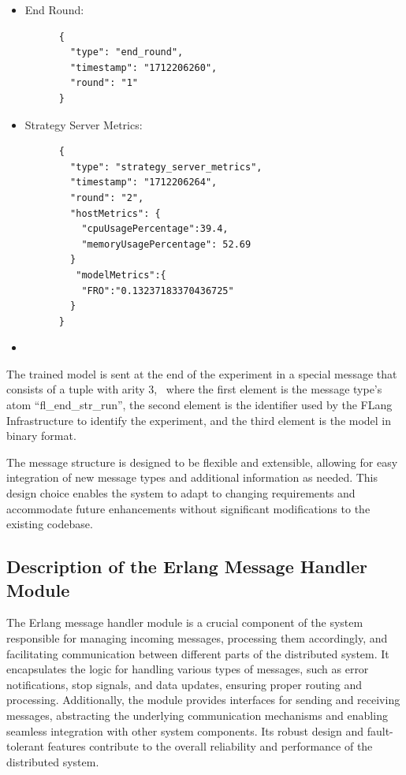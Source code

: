 \begin{itemize}
    \item End Round:
    \begin{verbatim}
      {
        "type": "end_round",
        "timestamp": "1712206260",
        "round": "1"
      }
    \end{verbatim}

    \item Strategy Server Metrics:
    \begin{verbatim}
      {
        "type": "strategy_server_metrics",
        "timestamp": "1712206264",
        "round": "2",
        "hostMetrics": {
          "cpuUsagePercentage":39.4,
          "memoryUsagePercentage": 52.69
        }
         "modelMetrics":{
          "FRO":"0.13237183370436725"
        }
      }
    \end{verbatim}
    \item
\end{itemize}

The trained model is sent at the end of the experiment in a special message that consists of a tuple with arity 3, \
where the first element is the message type's atom ``fl\_end\_str\_run'',
the second element is the identifier used by the FLang Infrastructure to identify the experiment, and the third element is the model in binary format.

The message structure is designed to be flexible and extensible, allowing for easy integration of new message types and
additional information as needed. This design choice enables the system to adapt to changing requirements and accommodate
future enhancements without significant modifications to the existing codebase.

\subsection{Description of the Erlang Message Handler Module}
The Erlang message handler module is a crucial component of the system responsible for managing incoming messages, processing them accordingly, and facilitating communication between different parts of the distributed system. It encapsulates the logic for handling various types of messages, such as error notifications, stop signals, and data updates, ensuring proper routing and processing. Additionally, the module provides interfaces for sending and receiving messages, abstracting the underlying communication mechanisms and enabling seamless integration with other system components. Its robust design and fault-tolerant features contribute to the overall reliability and performance of the distributed system.